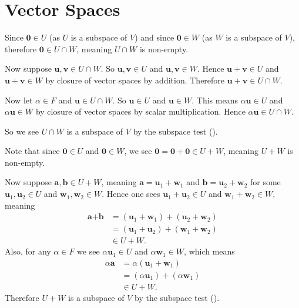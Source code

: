 \section{Vector Spaces}
\begin{questions}
    \item \begin{partquestions}{\alph*}
        \item Since $\textbf{0} \in U$ (as $U$ is a subspace of $V$) and since $\textbf{0} \in W$ (as $W$ is a subspace of $V$), therefore $\textbf{0} \in U \cap W$, meaning $U \cap W$ is non-empty.
        
        Now suppose $\textbf{u}, \textbf{v} \in U \cap W$. So $\textbf{u}, \textbf{v} \in U$ and $\textbf{u}, \textbf{v} \in W$. Hence $\textbf{u} + \textbf{v} \in U$ and $\textbf{u} + \textbf{v} \in W$ by closure of vector spaces by addition. Therefore $\textbf{u} + \textbf{v} \in U \cap W$.

        Now let $\alpha \in F$ and $\textbf{u} \in U \cap W$. So $\textbf{u} \in U$ and $\textbf{u} \in W$. This means $\alpha\textbf{u} \in U$ and $\alpha\textbf{u} \in W$ by closure of vector spaces by scalar multiplication. Hence $\alpha\textbf{u} \in U \cap W$.

        So we see $U \cap W$ is a subspace of $V$ by the subspace test ().

        \item Note that since $\textbf{0} \in U$ and $\textbf{0} \in W$, we see $\textbf{0} = \textbf{0} + \textbf{0} \in U + W$, meaning $U + W$ is non-empty.
        
        Now suppose $\textbf{a}, \textbf{b} \in U + W$, meaning $\textbf{a} = \textbf{u}_1 + \textbf{w}_1$ and $\textbf{b} = \textbf{u}_2 + \textbf{w}_2$ for some $\textbf{u}_1, \textbf{u}_2 \in U$ and $\textbf{w}_1, \textbf{w}_2 \in W$. Hence one sees $\textbf{u}_1 + \textbf{u}_2 \in U$ and $\textbf{w}_1 + \textbf{w}_2 \in W$, meaning
        \begin{align*}
            \textbf{a} + \textbf{b} &= (\textbf{u}_1 + \textbf{w}_1) + (\textbf{u}_2 + \textbf{w}_2)\\
            &= (\textbf{u}_1 + \textbf{u}_2) + (\textbf{w}_1 + \textbf{w}_2)\\
            &\in U + W.
        \end{align*}
        Also, for any $\alpha \in F$ we see $\alpha\textbf{u}_1 \in U$ and $\alpha\textbf{w}_1 \in W$, which means
        \begin{align*}
            \alpha\textbf{a} &= \alpha(\textbf{u}_1 + \textbf{w}_1)\\
            &= (\alpha\textbf{u}_1) + (\alpha\textbf{w}_1)\\
            &\in U + W.
        \end{align*}
        Therefore $U + W$ is a subspace of $V$ by the subspace test ().
    \end{partquestions}


\end{questions}
